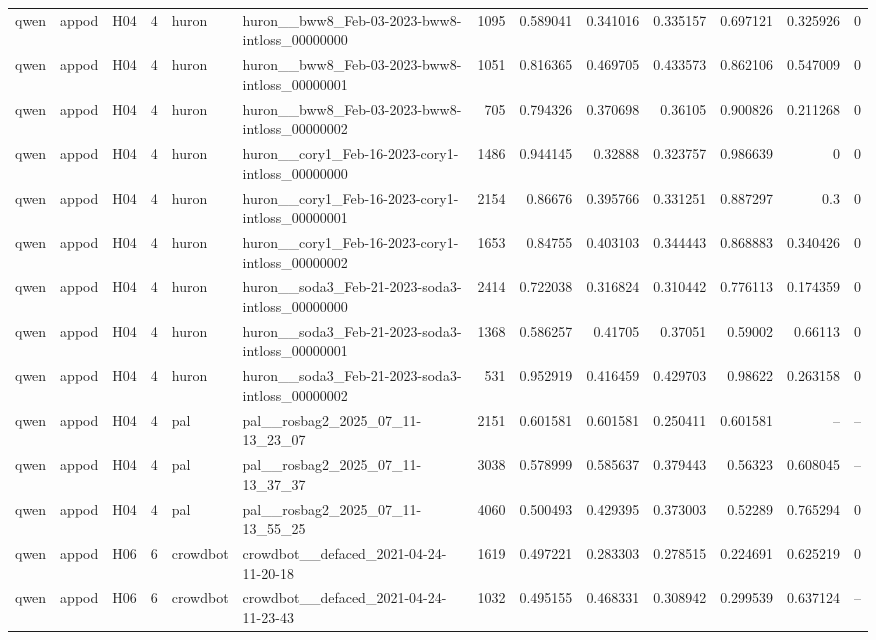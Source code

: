 \begin{longtable}{lllrllrrrrrrr}
qwen & appod & H04 & 4 & huron & huron\_\_bww8\_Feb-03-2023-bww8-intloss\_00000000 & 1095 & 0.589041 & 0.341016 & 0.335157 & 0.697121 & 0.325926 & 0 \\
qwen & appod & H04 & 4 & huron & huron\_\_bww8\_Feb-03-2023-bww8-intloss\_00000001 & 1051 & 0.816365 & 0.469705 & 0.433573 & 0.862106 & 0.547009 & 0 \\
qwen & appod & H04 & 4 & huron & huron\_\_bww8\_Feb-03-2023-bww8-intloss\_00000002 & 705 & 0.794326 & 0.370698 & 0.36105 & 0.900826 & 0.211268 & 0 \\
qwen & appod & H04 & 4 & huron & huron\_\_cory1\_Feb-16-2023-cory1-intloss\_00000000 & 1486 & 0.944145 & 0.32888 & 0.323757 & 0.986639 & 0 & 0 \\
qwen & appod & H04 & 4 & huron & huron\_\_cory1\_Feb-16-2023-cory1-intloss\_00000001 & 2154 & 0.86676 & 0.395766 & 0.331251 & 0.887297 & 0.3 & 0 \\
qwen & appod & H04 & 4 & huron & huron\_\_cory1\_Feb-16-2023-cory1-intloss\_00000002 & 1653 & 0.84755 & 0.403103 & 0.344443 & 0.868883 & 0.340426 & 0 \\
qwen & appod & H04 & 4 & huron & huron\_\_soda3\_Feb-21-2023-soda3-intloss\_00000000 & 2414 & 0.722038 & 0.316824 & 0.310442 & 0.776113 & 0.174359 & 0 \\
qwen & appod & H04 & 4 & huron & huron\_\_soda3\_Feb-21-2023-soda3-intloss\_00000001 & 1368 & 0.586257 & 0.41705 & 0.37051 & 0.59002 & 0.66113 & 0 \\
qwen & appod & H04 & 4 & huron & huron\_\_soda3\_Feb-21-2023-soda3-intloss\_00000002 & 531 & 0.952919 & 0.416459 & 0.429703 & 0.98622 & 0.263158 & 0 \\
qwen & appod & H04 & 4 & pal & pal\_\_rosbag2\_2025\_07\_11-13\_23\_07 & 2151 & 0.601581 & 0.601581 & 0.250411 & 0.601581 & -- & -- \\
qwen & appod & H04 & 4 & pal & pal\_\_rosbag2\_2025\_07\_11-13\_37\_37 & 3038 & 0.578999 & 0.585637 & 0.379443 & 0.56323 & 0.608045 & -- \\
qwen & appod & H04 & 4 & pal & pal\_\_rosbag2\_2025\_07\_11-13\_55\_25 & 4060 & 0.500493 & 0.429395 & 0.373003 & 0.52289 & 0.765294 & 0 \\
qwen & appod & H06 & 6 & crowdbot & crowdbot\_\_defaced\_2021-04-24-11-20-18 & 1619 & 0.497221 & 0.283303 & 0.278515 & 0.224691 & 0.625219 & 0 \\
qwen & appod & H06 & 6 & crowdbot & crowdbot\_\_defaced\_2021-04-24-11-23-43 & 1032 & 0.495155 & 0.468331 & 0.308942 & 0.299539 & 0.637124 & -- \\

\end{longtable}
